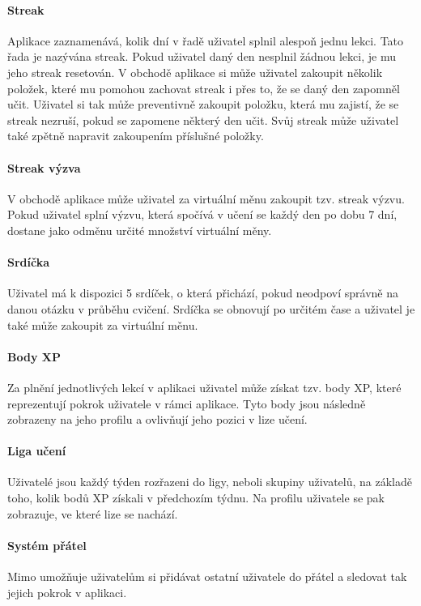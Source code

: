 \paragraph{Streak} Aplikace zaznamenává, kolik dní v řadě uživatel splnil alespoň jednu lekci. Tato řada je nazývána streak. Pokud uživatel daný den nesplnil žádnou lekci, je mu jeho streak resetován. V obchodě aplikace si může uživatel zakoupit několik položek, které mu pomohou zachovat streak i přes to, že se daný den zapomněl učit. Uživatel si tak může preventivně zakoupit položku, která mu zajistí, že se streak nezruší, pokud se zapomene některý den učit. Svůj streak může uživatel také zpětně napravit zakoupením příslušné položky.

\paragraph{Streak výzva} V obchodě aplikace může uživatel za virtuální měnu zakoupit tzv. streak výzvu. Pokud uživatel splní výzvu, která spočívá v učení se každý den po dobu 7 dní, dostane jako odměnu určité množství virtuální měny.

\paragraph{Srdíčka} Uživatel má k dispozici 5 srdíček, o která přichází, pokud neodpoví správně na danou otázku v průběhu cvičení. Srdíčka se obnovují po určitém čase a uživatel je také může zakoupit za virtuální měnu.

\paragraph{Body XP} Za plnění jednotlivých lekcí v aplikaci uživatel může získat tzv. body XP, které reprezentují pokrok uživatele v rámci aplikace. Tyto body jsou následně zobrazeny na jeho profilu a ovlivňují jeho pozici v lize učení.

\paragraph{Liga učení} Uživatelé jsou každý týden rozřazeni do ligy, neboli skupiny uživatelů, na základě toho, kolik bodů XP získali v předchozím týdnu. Na profilu uživatele se pak zobrazuje, ve které lize se nachází.

\paragraph{Systém přátel} Mimo umožňuje uživatelům si přidávat ostatní uživatele do přátel a sledovat tak jejich pokrok v aplikaci.

